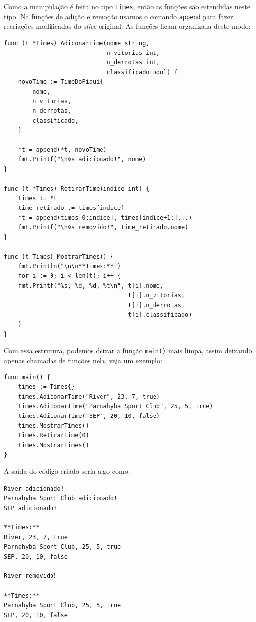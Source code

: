 \documentclass{SBCbookchapter}
\begin{document}
Como a manipulação é feita no tipo \texttt{Times}, então as funções são estendidas neste tipo. Na funções de adição e remoção usamos o comando \texttt{append} para fazer recriações modificadas do \textit{slice} original. As funções ficam organizada deste modo:

\begin{lstlisting}
func (t *Times) AdiconarTime(nome string,
							 n_vitorias int,
							 n_derrotas int,
							 classificado bool) {
	novoTime := TimeDoPiaui{
		nome,
		n_vitorias,
		n_derrotas,
		classificado,
	}
	
	*t = append(*t, novoTime)
	fmt.Printf("\n%s adicionado!", nome)
}

func (t *Times) RetirarTime(indice int) {
	times := *t
	time_retirado := times[indice]
	*t = append(times[0:indice], times[indice+1:]...)
	fmt.Printf("\n%s removido!", time_retirado.nome)
}

func (t Times) MostrarTimes() {
	fmt.Println("\n\n**Times:**")
	for i := 0; i < len(t); i++ {
	fmt.Printf("%s, %d, %d, %t\n", t[i].nome,
								   t[i].n_vitorias,
								   t[i].n_derrotas,
								   t[i].classificado)
	}
}
\end{lstlisting}

Com essa estrutura, podemos deixar a função \texttt{main()} mais limpa, assim deixando apenas chamadas de funções nela, veja um exemplo:

\begin{lstlisting}
func main() {
	times := Times{}
	times.AdiconarTime("River", 23, 7, true)
	times.AdiconarTime("Parnahyba Sport Club", 25, 5, true)
	times.AdiconarTime("SEP", 20, 10, false)
	times.MostrarTimes()
	times.RetirarTime(0)
	times.MostrarTimes()
}
\end{lstlisting}

A saída do código criado seria algo como:

\noindent\texttt{River adicionado!}\\
\texttt{Parnahyba Sport Club adicionado!}\\
\texttt{SEP adicionado!}\\ \\
\texttt{**Times:**}\\
\texttt{River, 23, 7, true}\\
\texttt{Parnahyba Sport Club, 25, 5, true}\\
\texttt{SEP, 20, 10, false}\\ \\
\texttt{River removido}!\\ \\
\texttt{**Times:**}\\
\texttt{Parnahyba Sport Club, 25, 5, true}\\
\texttt{SEP, 20, 10, false}\\
\end{document}

